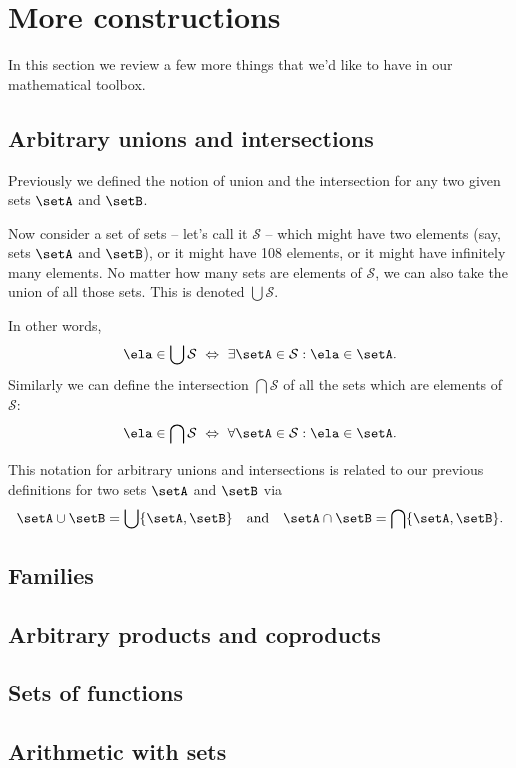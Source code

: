 
\section{More constructions}
\label{sec:more-constructions}

In this section we review a few more things that we'd like to have in our mathematical toolbox. 


\subsection{Arbitrary unions and intersections}

Previously we defined the notion of union and the intersection for any two given sets $\setA$ and $\setB$. 

Now consider a set of sets -- let's call it $\mathcal{S}$ -- which might have two elements (say, sets $\setA$ and $\setB$), or it might have 108 elements, or it might have infinitely many elements. No matter how many sets are elements of $\mathcal{S}$, we can also take the union of all those sets. This is denoted $\bigcup \mathcal{S}$. 

In other words, 
%
\begin{equation*}
    \ela \in \bigcup \mathcal{S}  \ \Leftrightarrow \ \exists \setA \in \mathcal{S} : \ela \in \setA.
\end{equation*}
%
Similarly we can define the intersection $\bigcap \mathcal{S}$ of all the sets which are elements of $\mathcal{S}$: 
%
\begin{equation*}
     \ela \in \bigcap \mathcal{S} \ \Leftrightarrow \  \forall \setA \in \mathcal{S} : \ela \in \setA.
\end{equation*}

This notation for arbitrary unions and intersections is related to our previous definitions for two sets $\setA$ and $\setB$ via
\begin{equation}
\setA \cup \setB = \bigcup \{ \setA, \setB \} \quad \text{and} \quad \setA \cap \setB = \bigcap \{ \setA, \setB \}.
\end{equation}



\subsection{Families}



\subsection{Arbitrary products and coproducts}


\subsection{Sets of functions}


\subsection{Arithmetic with sets}